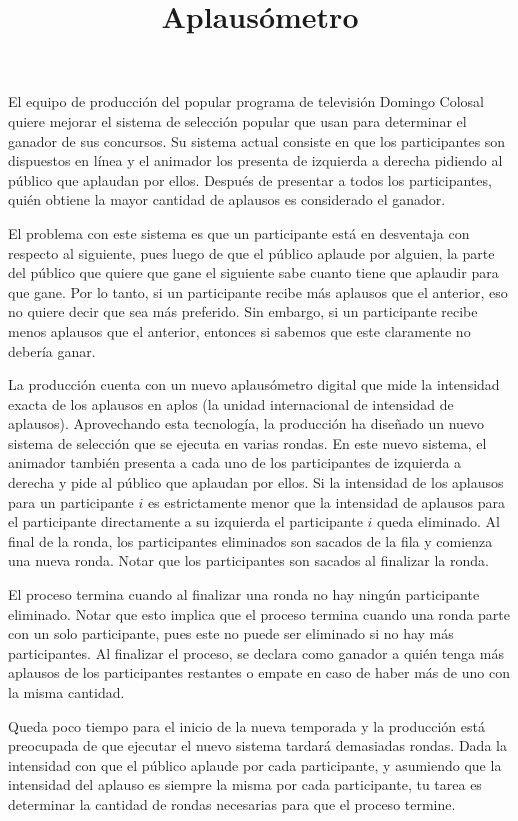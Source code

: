 \documentclass{oci}
\title{Aplausómetro}
\begin{document}
\begin{problemDescription}
El equipo de producción del popular programa de televisión
Domingo Colosal quiere mejorar el sistema de selección
popular que usan para determinar el ganador de sus concursos.
%
Su sistema actual consiste en que los participantes
son dispuestos en línea y el animador los presenta de
izquierda a derecha pidiendo al público que aplaudan por ellos.
%
Después de presentar a todos los participantes, quién obtiene
la mayor cantidad de aplausos es considerado el ganador.

El problema con este sistema es que
un participante está en desventaja con respecto
al siguiente, pues luego de que el público aplaude por
alguien, la parte del público que quiere que gane el siguiente
sabe cuanto tiene que aplaudir para que gane.
%
Por lo tanto, si un participante recibe más aplausos
que el anterior, eso no quiere decir que sea más preferido.
%
Sin embargo, si un participante recibe menos aplausos
que el anterior, entonces si sabemos que este claramente
no debería ganar.

La producción cuenta con un nuevo aplausómetro digital
que mide la intensidad exacta de los aplausos en aplos
(la unidad internacional de intensidad de aplausos).
%
Aprovechando esta tecnología, la producción ha diseñado
un nuevo sistema de selección que se ejecuta en varias rondas.
%
En este nuevo sistema, el animador también presenta a cada uno
de los participantes de izquierda a derecha y pide al público
que aplaudan por ellos.
%
Si la intensidad de los aplausos para un participante $i$ es estrictamente
menor que la intensidad de aplausos para el participante directamente a
su izquierda el participante $i$ queda eliminado.
%
Al final de la ronda, los participantes eliminados son sacados
de la fila y comienza una nueva ronda.
%
Notar que los participantes son sacados al finalizar la ronda.

El proceso termina cuando al finalizar una ronda
no hay ningún participante eliminado.
%
Notar que esto implica que el proceso termina cuando una
ronda parte con un solo participante, pues este no puede
ser eliminado si no hay más participantes.
%
Al finalizar el proceso, se declara como ganador a quién
tenga más aplausos de los participantes restantes o empate
en caso de haber más de uno con la misma cantidad.

Queda poco tiempo para el inicio de la nueva temporada
y la producción está preocupada de que ejecutar el nuevo sistema
tardará demasiadas rondas.
%
Dada la intensidad con que el público aplaude por cada participante,
y asumiendo que la intensidad del aplauso es siempre la misma por
cada participante, tu tarea es determinar la cantidad de rondas
necesarias para que el proceso termine.
\end{problemDescription}
\end{document}
